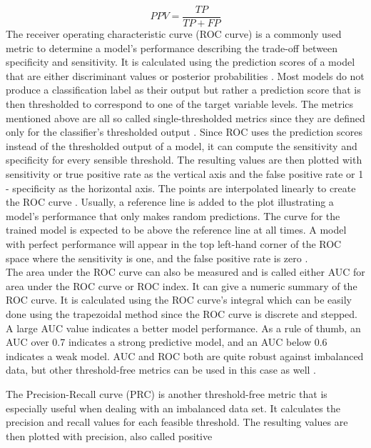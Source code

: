 \begin{equation}
 PPV = \frac{TP}{TP+FP}
 \label{eq:ppv}
\end{equation}
The receiver operating characteristic curve (ROC curve) is a commonly used 
metric to determine a model's performance describing the trade-off between 
specificity and sensitivity. It is calculated using the prediction scores of a 
model that are either discriminant values or posterior 
probabilities \cite{RN161}. Most models do not produce a classification label 
as their output but rather a prediction score that is then thresholded to 
correspond to one of the target variable levels. The metrics mentioned above 
are all 
so called single-thresholded metrics since they are defined only for the 
classifier's thresholded output \cite{RN161, RN167}. Since ROC uses the 
prediction scores instead of the thresholded output of a model, it can compute 
the sensitivity and specificity for every sensible threshold. The resulting 
values are then plotted with sensitivity or true positive rate as the vertical 
axis and the false positive rate or 1 - specificity as the 
horizontal axis. The points are interpolated linearly to create the ROC curve  
\cite{RN161}. Usually, a reference line is added to the plot illustrating a 
model's performance that only makes random predictions. The curve for the 
trained model is expected to be above the reference line at all times. 
A model with perfect performance will appear in the top left-hand corner 
of the ROC space where the sensitivity is one, and the false positive rate is 
zero \cite{RN167, RN159}.
\\
The area under the ROC curve can also be measured and is called either AUC for 
area under the ROC curve or ROC index. It can give a numeric summary of the ROC 
curve. It is calculated using the ROC curve's integral which can be easily 
done using the trapezoidal method since the ROC curve is discrete and stepped. 
A large AUC value indicates a better model performance. As a rule of thumb, an 
AUC over 0.7 indicates a strong predictive model, and an AUC below 0.6 
indicates 
a weak model. AUC and ROC both are quite robust against imbalanced data, but 
other threshold-free metrics can be used in this case as 
well \cite{RN167, RN159}.
\par
The Precision-Recall curve (PRC) is another threshold-free metric that is 
especially useful when dealing with an imbalanced data set. It calculates the 
precision and recall values for each feasible threshold. The 
resulting values are then plotted with precision, also called positive 
